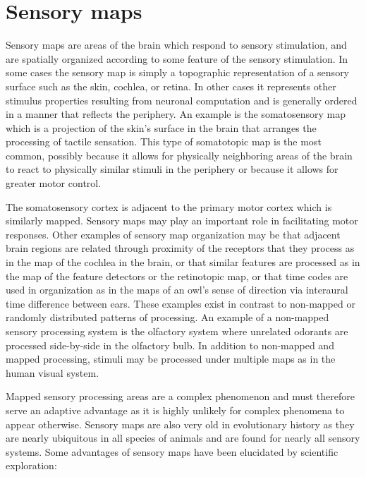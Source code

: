 \hypertarget{sensory-maps}{%
\section{Sensory maps}\label{sensory-maps}}

Sensory maps are areas of the brain which respond to sensory stimulation, and are spatially organized according to some feature of the sensory stimulation. In some cases the sensory map is simply a topographic representation of a sensory surface such as the skin, cochlea, or retina. In other cases it represents other stimulus properties resulting from neuronal computation and is generally ordered in a manner that reflects the periphery. An example is the somatosensory map which is a projection of the skin's surface in the brain that arranges the processing of tactile sensation. This type of somatotopic map is the most common, possibly because it allows for physically neighboring areas of the brain to react to physically similar stimuli in the periphery or because it allows for greater motor control.

The somatosensory cortex is adjacent to the primary motor cortex which is similarly mapped. Sensory maps may play an important role in facilitating motor responses. Other examples of sensory map organization may be that adjacent brain regions are related through proximity of the receptors that they process as in the map of the cochlea in the brain, or that similar features are processed as in the map of the feature detectors or the retinotopic map, or that time codes are used in organization as in the maps of an owl's sense of direction via interaural time difference between ears. These examples exist in contrast to non-mapped or randomly distributed patterns of processing. An example of a non-mapped sensory processing system is the olfactory system where unrelated odorants are processed side-by-side in the olfactory bulb. In addition to non-mapped and mapped processing, stimuli may be processed under multiple maps as in the human visual system.

Mapped sensory processing areas are a complex phenomenon and must therefore serve an adaptive advantage as it is highly unlikely for complex phenomena to appear otherwise. Sensory maps are also very old in evolutionary history as they are nearly ubiquitous in all species of animals and are found for nearly all sensory systems. Some advantages of sensory maps have been elucidated by scientific exploration:

